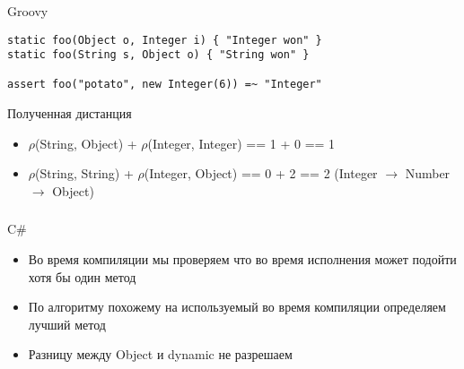 \documentclass[t]{beamer}  %
\begin{document}
\begin{frame}[fragile]
	\frametitle{\insertsection} 
  	\framesubtitle{\insertsubsection}
    \begin{block}{Groovy}
		\begin{verbatim}
static foo(Object o, Integer i) { "Integer won" }
static foo(String s, Object o) { "String won" }

assert foo("potato", new Integer(6)) =~ "Integer"
		\end{verbatim}
	\end{block}
	\begin{block}{Полученная дистанция}
    \begin{itemize}
	    \item $\rho$(String, Object) + $\rho$(Integer, Integer) == 1 + 0 == 1
	    \item $\rho$(String, String) + $\rho$(Integer, Object) == 0 + 2 == 2 (Integer $\rightarrow$ Number $\rightarrow$ Object)
	\end{itemize}
    \end{block}
\end{frame}

 
 

\begin{frame}[fragile]
	\frametitle{\insertsection} 
  	\framesubtitle{\insertsubsection}
    \begin{block}{C\#}
\begin{itemize}
\item Во время компиляции мы проверяем что во время исполнения может подойти хотя бы один метод
\item По алгоритму похожему на используемый во время компиляции определяем лучший метод
\item Разницу между Object и dynamic не разрешаем
\end{itemize}
    \end{block}
\end{frame}
\end{document}
